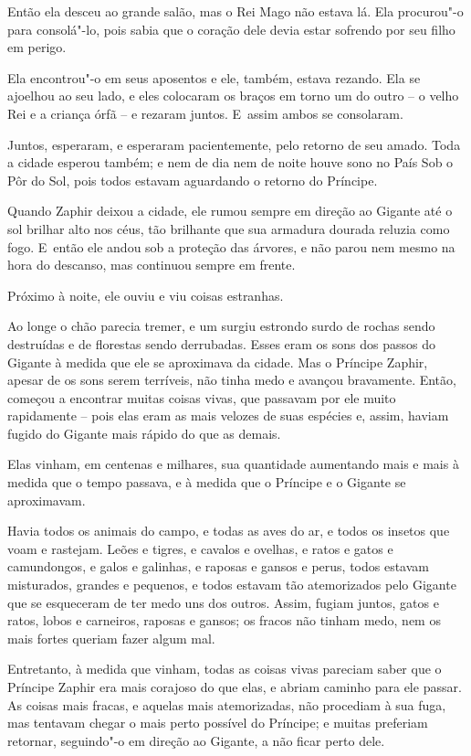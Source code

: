 Então ela desceu ao grande salão, mas o Rei Mago não estava lá. Ela
procurou"-o para consolá"-lo, pois sabia que o coração dele devia estar
sofrendo por seu filho em perigo.

Ela encontrou"-o em seus aposentos e ele, também, estava rezando. Ela se
ajoelhou ao seu lado, e eles colocaram os braços em torno um do outro --
o velho Rei e a criança órfã -- e rezaram juntos. E~assim ambos se
consolaram.

Juntos, esperaram, e esperaram pacientemente, pelo retorno de seu amado.
Toda a cidade esperou também; e nem de dia nem de noite houve sono no
País Sob o Pôr do Sol, pois todos estavam aguardando o retorno do
Príncipe.

Quando Zaphir deixou a cidade, ele rumou sempre em direção ao Gigante
até o sol brilhar alto nos céus, tão brilhante que sua armadura dourada
reluzia como fogo. E~então ele andou sob a proteção das árvores, e não
parou nem mesmo na hora do descanso, mas continuou sempre em frente.

Próximo à noite, ele ouviu e viu coisas estranhas.

Ao longe o chão parecia tremer, e um surgiu estrondo surdo de rochas
sendo destruídas e de florestas sendo derrubadas. Esses eram os sons dos
passos do Gigante à medida que ele se aproximava da cidade. Mas o
Príncipe Zaphir, apesar de os sons serem terríveis, não tinha medo e
avançou bravamente. Então, começou a encontrar muitas coisas vivas, que
passavam por ele muito rapidamente -- pois elas eram as mais velozes de
suas espécies e, assim, haviam fugido do Gigante mais rápido do que as
demais.

Elas vinham, em centenas e milhares, sua quantidade aumentando mais e
mais à medida que o tempo passava, e à medida que o Príncipe e o Gigante
se aproximavam.

Havia todos os animais do campo, e todas as aves do ar, e todos os
insetos que voam e rastejam. Leões e tigres, e cavalos e ovelhas, e
ratos e gatos e camundongos, e galos e galinhas, e raposas e gansos e
perus, todos estavam misturados, grandes e pequenos, e todos estavam tão
atemorizados pelo Gigante que se esqueceram de ter medo uns dos outros.
Assim, fugiam juntos, gatos e ratos, lobos e carneiros, raposas e
gansos; os fracos não tinham medo, nem os mais fortes queriam fazer
algum mal.

Entretanto, à medida que vinham, todas as coisas vivas pareciam saber
que o Príncipe Zaphir era mais corajoso do que elas, e abriam caminho
para ele passar. As coisas mais fracas, e aquelas mais atemorizadas, não
procediam à sua fuga, mas tentavam chegar o mais perto possível do
Príncipe; e muitas preferiam retornar, seguindo"-o em direção ao Gigante,
a não ficar perto dele.

